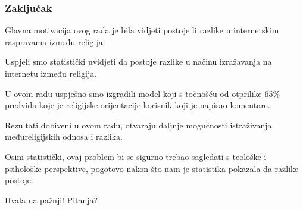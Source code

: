 \documentclass{beamer}
\begin{document}
\begin{frame}
\frametitle{Zaključak}
Glavna motivacija ovog rada je bila vidjeti postoje li razlike u internetskim raspravama između religija. 
\bigskip

Uspjeli smo statistički uvidjeti da postoje razlike u načinu izražavanja na internetu između religija.
\bigskip

U ovom radu uspješno smo izgradili model koji s točnošću od otprilike 65\% predviđa koje je religijske orijentacije korisnik koji je napisao komentare.
\bigskip

Rezultati dobiveni u ovom radu, otvaraju daljnje mogućnosti istraživanja međureligijskih odnosa i razlika. 
\bigskip

Osim statistički, ovaj problem bi se sigurno trebao sagledati s teološke i psihološke perspektive, pogotovo nakon što nam je statistika pokazala da razlike postoje.



\end{frame}

\begin{frame}
\begin{center}
\Huge Hvala na pažnji! Pitanja?
\end{center}
\end{frame}
 
\end{document}
